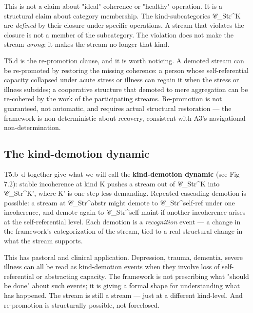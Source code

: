 \documentclass[11pt, openany]{book}
\newcommand{\sectionbreak}{\clearpage}
\begin{document}
This is not a claim about "ideal" coherence or "healthy" operation. It is a structural claim about category membership. The kind-subcategories 𝒞\_\allowbreak{}Str\textasciicircum{}K are \textit{defined} by their closure under specific operations. A stream that violates the closure is not a member of the subcategory. The violation does not make the stream \textit{wrong}; it makes the stream no longer-that-kind.

T5.d is the re-promotion clause, and it is worth noticing. A demoted stream can be re-promoted by restoring the missing coherence: a person whose self-referential capacity collapsed under acute stress or illness can regain it when the stress or illness subsides; a cooperative structure that demoted to mere aggregation can be re-cohered by the work of the participating streams. Re-promotion is not guaranteed, not automatic, and requires actual structural restoration --- the framework is non-deterministic about recovery, consistent with A3's navigational non-determination.

\subsection{The kind-demotion dynamic}

T5.b–d together give what we will call the \textbf{kind-demotion dynamic} (see Fig 7.2): stable incoherence at kind K pushes a stream out of 𝒞\_\allowbreak{}Str\textasciicircum{}K into 𝒞\_\allowbreak{}Str\textasciicircum{}K', where K' is one step less demanding. Repeated cascading demotion is possible: a stream at 𝒞\_\allowbreak{}Str\textasciicircum{}abstr might demote to 𝒞\_\allowbreak{}Str\textasciicircum{}self-ref under one incoherence, and demote again to 𝒞\_\allowbreak{}Str\textasciicircum{}self-maint if another incoherence arises at the self-referential level. Each demotion is a \textit{recognition} event --- a change in the framework's categorization of the stream, tied to a real structural change in what the stream supports.

This has pastoral and clinical application. Depression, trauma, dementia, severe illness can all be read as kind-demotion events when they involve loss of self-referential or abstracting capacity. The framework is not prescribing what "should be done" about such events; it is giving a formal shape for understanding what has happened. The stream is still a stream --- just at a different kind-level. And re-promotion is structurally possible, not foreclosed.

\sectionbreak
\end{document}

